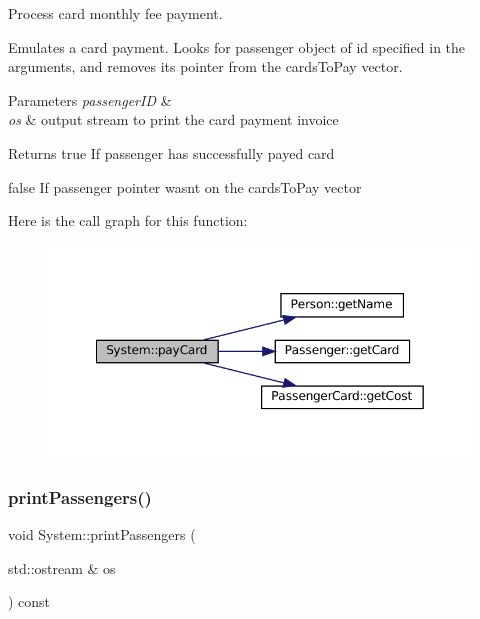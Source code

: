 Process card monthly fee payment. 

Emulates a card payment. Looks for passenger object of id specified in the arguments, and removes it\textquotesingle{}s pointer from the cards\+To\+Pay vector.


\begin{DoxyParams}{Parameters}
{\em passenger\+ID} & \\
\hline
{\em os} & output stream to print the card payment invoice \\
\hline
\end{DoxyParams}
\begin{DoxyReturn}{Returns}
true If passenger has successfully payed card 

false If passenger pointer wasn\textquotesingle{}t on the cards\+To\+Pay vector 
\end{DoxyReturn}
Here is the call graph for this function\+:
\nopagebreak
\begin{figure}[H]
\begin{center}
\leavevmode
\includegraphics[width=349pt]{classSystem_a93e28750e7677d09a7eb2acfc2590209_cgraph}
\end{center}
\end{figure}
\mbox{\label{classSystem_a1c5753d5c70d15dc3fe56fd5e421ba76}} 
\subsubsection{\texorpdfstring{print\+Passengers()}{printPassengers()}}
{\footnotesize\ttfamily void System\+::print\+Passengers (\begin{DoxyParamCaption}\item[{std\+::ostream \&}]{os }\end{DoxyParamCaption}) const}



